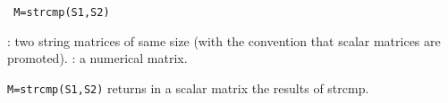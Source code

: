 
\begin{mandesc}
\end{mandesc}
\begin{calling_sequence}
\begin{verbatim}
 M=strcmp(S1,S2)  
\end{verbatim}
\end{calling_sequence}
\begin{parameters}
  \begin{varlist}
     : two string matrices of same size (with the convention that 
    scalar matrices are promoted).
     : a numerical matrix.
  \end{varlist}
\end{parameters}
\begin{mandescription}
  \verb!M=strcmp(S1,S2)! returns in a scalar matrix the results of strcmp. 
\end{mandescription}
\begin{examples}
  \begin{program}
  \end{program}
\end{examples}
\begin{manseealso}
\end{manseealso}

